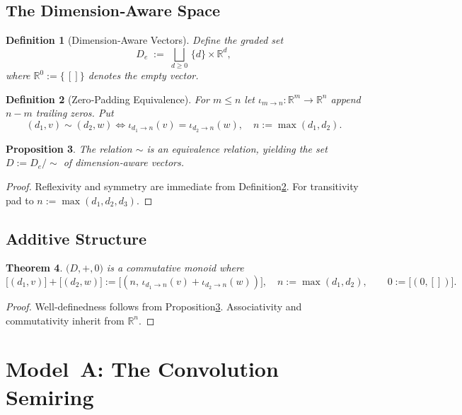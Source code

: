 \documentclass[11pt]{article}
\newtheorem{theorem}{Theorem}[section]
\newtheorem{proposition}[theorem]{Proposition}
\newtheorem{definition}[theorem]{Definition}
\begin{document}
\subsection{The Dimension‑Aware Space}
\begin{definition}[Dimension‑Aware Vectors]\label{def:DAspace}
Define the graded set
\[
  D_e\;:=\;\bigsqcup_{d\ge0}\,\{d\}\times\mathbb R^{d},
\]
where \(\mathbb R^{0}:=\{\,[]\}\) denotes the empty vector.
\end{definition}

\begin{definition}[Zero‑Padding Equivalence]\label{def:padding}
For \(m\le n\) let \(\iota_{m\rightarrow n}\colon\mathbb R^{m}\to\mathbb R^{n}\) append \(n-m\) trailing zeros.  Put
\[
  (d_1,v)\sim(d_2,w)
  \iff \iota_{d_1\rightarrow n}(v)=\iota_{d_2\rightarrow n}(w),\quad n:=\max(d_1,d_2).
\]
\end{definition}

\begin{proposition}\label{prop:equiv}
The relation \(\sim\) is an equivalence relation, yielding the set \(D:=D_e/\!\sim\) of \emph{dimension‑aware vectors}.
\end{proposition}
\begin{proof}
Reflexivity and symmetry are immediate from Definition\;\ref{def:padding}.  For transitivity pad to \(n:=\max(d_1,d_2,d_3)\).\qedhere
\end{proof}

\subsection{Additive Structure}
\begin{theorem}\label{thm:add}
\(\bigl(D,+,0\bigr)\) is a commutative monoid where
\[
  \bigl[(d_1,v)\bigr]+\bigl[(d_2,w)\bigr]
  :=\bigl[(n,\,\iota_{d_1\rightarrow n}(v)+\iota_{d_2\rightarrow n}(w))\bigr],
  \quad n:=\max(d_1,d_2),\qquad
  0:=\bigl[(0,[])\bigr].
\]
\end{theorem}
\begin{proof}
Well‑definedness follows from Proposition\;\ref{prop:equiv}. Associativity and commutativity inherit from \(\mathbb R^n\).\qedhere
\end{proof}

\section{Model A: The Convolution Semiring}
\end{document}
